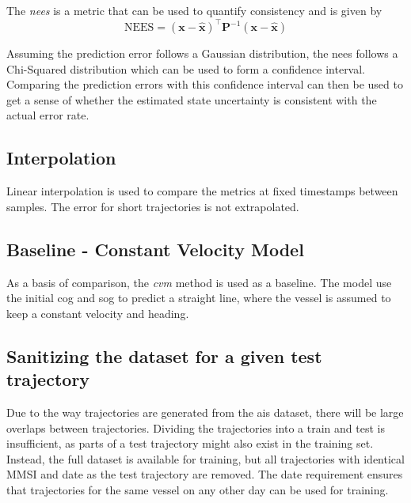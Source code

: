 The \textit{\acrfull{nees}} is a metric that can be used to quantify consistency and is given by
\begin{equation}
    \text{NEES} = (\boldsymbol{x} - \hat{\boldsymbol{x}})^\intercal \boldsymbol{P}^{-1} (\boldsymbol{x} - \hat{\boldsymbol{x}})
\end{equation}

Assuming the prediction error follows a Gaussian distribution, the \acrshort{nees} follows a Chi-Squared distribution which can be used to form a confidence interval. Comparing the prediction errors with this confidence interval can then be used to get a sense of whether the estimated state uncertainty is consistent with the actual error rate.

\subsection{Interpolation}
Linear interpolation is used to compare the metrics at fixed timestamps between samples. The error for short trajectories is not extrapolated.

\subsection{Baseline - Constant Velocity Model}
As a basis of comparison, the \textit{\acrfull{cvm}} method is used as a baseline. The model use the initial \acrshort{cog} and \acrshort{sog} to predict a straight line, where the vessel is assumed to keep a constant velocity and heading.

\subsection{Sanitizing the dataset for a given test trajectory}
Due to the way trajectories are generated from the \acrshort{ais} dataset, there will be large overlaps between trajectories. Dividing the trajectories into a train and test is insufficient, as parts of a test trajectory might also exist in the training set. Instead, the full dataset is available for training, but all trajectories with identical MMSI and date as the test trajectory are removed. The date requirement ensures that trajectories for the same vessel on any other day can be used for training.

